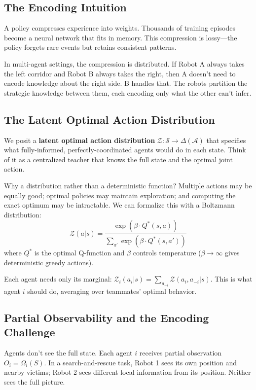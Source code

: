 \documentclass[10pt, letterpaper]{article}
\begin{document}
\subsection{The Encoding Intuition}

A policy compresses experience into weights. Thousands of training episodes become a neural network that fits in memory. This compression is lossy---the policy forgets rare events but retains consistent patterns.

In multi-agent settings, the compression is distributed. If Robot A always takes the left corridor and Robot B always takes the right, then A doesn't need to encode knowledge about the right side. B handles that. The robots partition the strategic knowledge between them, each encoding only what the other can't infer.

\subsection{The Latent Optimal Action Distribution}

We posit a \textbf{latent optimal action distribution} $\mathcal{Z}: \mathcal{S} \to \Delta(\mathcal{A})$ that specifies what fully-informed, perfectly-coordinated agents would do in each state. Think of it as a centralized teacher that knows the full state and the optimal joint action.

Why a distribution rather than a deterministic function? Multiple actions may be equally good; optimal policies may maintain exploration; and computing the exact optimum may be intractable. We can formalize this with a Boltzmann distribution:
\[\mathcal{Z}(a|s) = \frac{\exp(\beta \cdot Q^*(s,a))}{\sum_{a'} \exp(\beta \cdot Q^*(s,a'))}\]
where $Q^*$ is the optimal Q-function and $\beta$ controls temperature ($\beta \to \infty$ gives deterministic greedy actions).

Each agent needs only its marginal: $\mathcal{Z}_i(a_i|s) = \sum_{a_{-i}} \mathcal{Z}(a_i, a_{-i}|s)$. This is what agent $i$ should do, averaging over teammates' optimal behavior.

\subsection{Partial Observability and the Encoding Challenge}

Agents don't see the full state. Each agent $i$ receives partial observation $O_i = \Omega_i(S)$. In a search-and-rescue task, Robot 1 sees its own position and nearby victims; Robot 2 sees different local information from its position. Neither sees the full picture.
\end{document}
